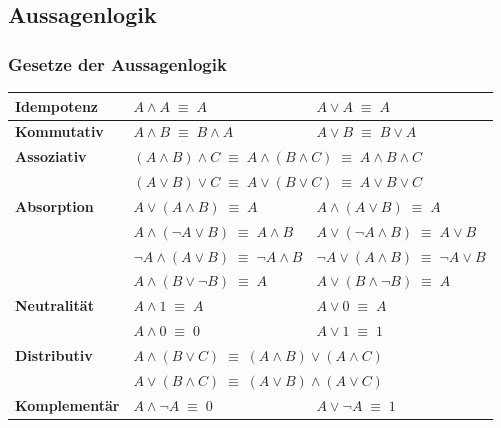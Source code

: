\documentclass[6pt,a4paper]{scrartcl}
\begin{document}

\begin{multicols*}{3}

\subsection{Aussagenlogik}
\subsubsection{Gesetze der Aussagenlogik}
\begin{tabular}{l|l|l}	
	\textbf{Idempotenz} 	& $A \land A \; \equiv \; A $ & $A \lor A \; \equiv \; A$ \\
	\hline
	\textbf{Kommutativ}	& $A \land B \; \equiv \; B \land A$ & $A \lor B \; \equiv \; B \lor A$ \\
	\hline
	\textbf{Assoziativ} 	& \multicolumn{2}{l}{$(A \land B)\land C \; \equiv \; A \land (B \land C)\; \equiv \; A \land B \land C$} \\
						& \multicolumn{2}{l}{$(A \lor B) \lor C \; \equiv \; A \lor (B \lor C)\; \equiv \; A \lor B \lor C$}\\
	\hline
	\textbf{Absorption} 	& $A \lor (A \land B) \; \equiv \; A$ & $A \land (A \lor B) \; \equiv \; A$ \\
						& $A \land (\neg A \lor B) \; \equiv \; A \land B$ & $A \lor (\neg A \land B) \; \equiv \; A \lor B$ \\
						& $\neg A \land (A \lor B) \; \equiv \; \neg A \land B$ & $\neg A \lor (A \land B) \; \equiv \; \neg A \lor B$ \\
						& $A \land (B \lor \neg B) \; \equiv \; A$ & $A \lor (B \land \neg B) \; \equiv \; A$ \\
	\hline
	\textbf{Neutralität}	& $A \land 1 \; \equiv \; A$ & $A \lor 0 \; \equiv \; A$ \\
						& $A \land 0 \; \equiv \; 0$ & $A \lor 1 \; \equiv \; 1$ \\
	\hline
	\textbf{Distributiv}	& \multicolumn{2}{l}{$A \land (B \lor C) \; \equiv \; (A \land B) \lor (A \land C)$} \\
						& \multicolumn{2}{l}{$A \lor (B \land C) \; \equiv \; (A \lor B) \land (A \lor C)$} \\
	\hline
	\textbf{Komplementär}	& $A \land \neg A \; \equiv \; 0$ & $A \lor \neg A \; \equiv \; 1$ \\

\end{tabular}
\end{multicols*}
\end{document}
